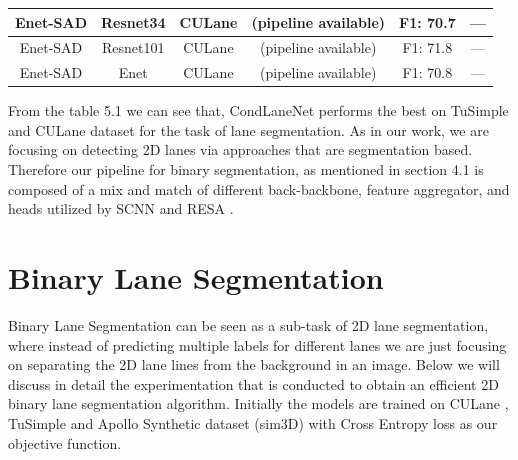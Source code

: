 \begin{table}[]
\begin{tabular}{|c|c|c|c|c|c|}
Enet-SAD          & Resnet34                                                            & CULane           & (pipeline available)                                                  & F1: 70.7                                                            & —                                                                                   \\ \hline
Enet-SAD          & Resnet101                                                           & CULane           & (pipeline available)                                                  & F1: 71.8                                                            & —                                                                                   \\ \hline
Enet-SAD          & Enet                                                                & CULane           & (pipeline available)                                                  & F1: 70.8                                                            & —                                                                                   \\ \hline
\end{tabular}
\end{table}
From the table 5.1 we can see that, CondLaneNet \cite{DBLP:journals/corr/abs-2105-05003} performs the best on TuSimple \cite{Tusimple} and CULane \cite{pan2018SCNN} dataset for the task of lane segmentation. As in our work, we are focusing on detecting 2D lanes via approaches that are segmentation based. Therefore our pipeline for binary segmentation, as mentioned in section 4.1 is composed of a mix and match of different back-backbone, feature aggregator, and heads utilized by SCNN \cite{pan2018SCNN} and RESA \cite{DBLP:journals/corr/abs-2008-13719}. 
    
    
    \section{Binary Lane Segmentation}
    Binary Lane Segmentation can be seen as a sub-task of 2D lane segmentation, where instead of predicting multiple labels for different lanes we are just focusing on separating the 2D lane lines from the background in an image. Below we will discuss in detail the experimentation that is conducted to obtain an efficient 2D binary lane segmentation algorithm. Initially the models are trained on CULane \cite{pan2018SCNN}, TuSimple \cite{Tusimple} and Apollo Synthetic dataset (sim3D) \cite{guo2020gen} with Cross Entropy loss as our objective function. 
          
